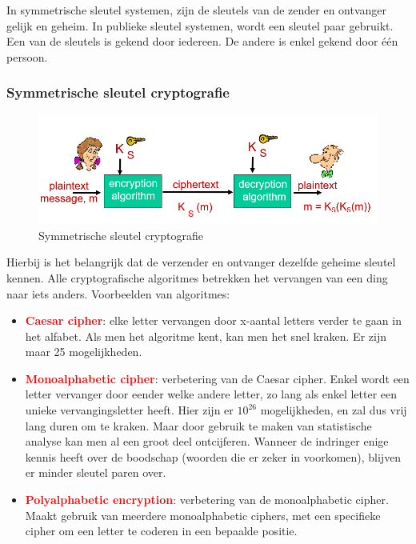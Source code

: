 \noindent In symmetrische sleutel systemen, zijn de sleutels van de zender en ontvanger gelijk en geheim.
In publieke sleutel systemen, wordt een sleutel paar gebruikt. Een van de sleutels is gekend door iedereen. De andere is enkel gekend door één persoon.

\newpage

\subsubsection{Symmetrische sleutel cryptografie}

\begin{figure}[h]
    \centering
    \includegraphics[width=7in]{./img/imghfdst8/hfdst8puntje3.png}
    \caption{Symmetrische sleutel cryptografie }      
    \label{fig:Symmetrische sleutel cryptografie }
\end{figure}

\noindent Hierbij is het belangrijk dat de verzender en ontvanger dezelfde geheime sleutel kennen.
Alle cryptografische algoritmes betrekken het vervangen van een ding naar iets anders.
Voorbeelden van algoritmes:
\begin{itemize}
    \item \textcolor{red}{\textbf{Caesar cipher}}: elke letter vervangen door x-aantal letters verder te gaan in het alfabet. Als men het algoritme kent, kan men het snel kraken. Er zijn maar 25 mogelijkheden.
    \item \textcolor{red}{\textbf{Monoalphabetic cipher}}: verbetering van de Caesar cipher. Enkel wordt een letter vervanger door eender welke andere letter, zo lang als enkel letter een unieke vervangingsletter heeft. Hier zijn er $10^{26}$ mogelijkheden, en zal dus vrij lang duren om te kraken. Maar door gebruik te maken van statistische analyse kan men al een groot deel ontcijferen. Wanneer de indringer enige kennis heeft over de boodschap (woorden die er zeker in voorkomen), blijven er minder sleutel paren over.
    \item \textcolor{red}{\textbf{Polyalphabetic encryption}}: verbetering van de monoalphabetic cipher. Maakt gebruik van meerdere monoalphabetic ciphers, met een specifieke cipher om een letter te coderen in een bepaalde positie.
\end{itemize}



